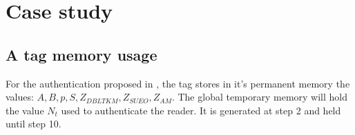 \chapter{Case study}

\section{A tag memory usage}

    For the authentication proposed in \cite{BOM}, the tag stores in it's permanent memory the values: \textit{$A, B, p, S, Z_{DBLTKM}, Z_{SUEO}, Z_{AM}$}.
    The global temporary memory will hold the value $N_t$
    used to authenticate the reader. It is generated at step 2 and held until step 10.

